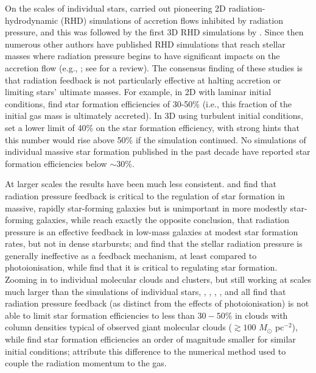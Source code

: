 \documentclass[useAMS,usenatbib]{mn2e}
\begin{document}
On the scales of individual stars, \citet{yorke02a} carried out pioneering 2D radiation-hydrodynamic (RHD) simulations of accretion flows inhibited by radiation pressure, and this was followed by the first 3D RHD simulations by \citet{krumholz09c}. Since then numerous other authors have published RHD simulations that reach stellar masses where radiation pressure begins to have significant impacts on the accretion flow (e.g., \citealt{kuiper10b, kuiper11a, cunningham11a, myers13a, kuiper15a, kuiper16a, klassen16a, rosen16a}; see \citealt{tan14a} for a review). The consensus finding of these studies is that radiation feedback is not particularly effective at halting accretion or limiting stars' ultimate masses. For example, in 2D with laminar initial conditions, \citet{kuiper10b} find star formation efficiencies of 30-50\% (i.e., this fraction of the initial gas mass is ultimately accreted). In 3D using turbulent initial conditions, \citet{rosen16a} set a lower limit of 40\% on the star formation efficiency, with strong hints that this number would rise above 50\% if the simulation continued. No simulations of individual massive star formation published in the past decade have reported star formation efficiencies below $\sim 30\%$.

At larger scales the results have been much less consistent. \citet{hopkins11a, hopkins12b} and \citet{hopkins12f} find that radiation pressure feedback is critical to the regulation of star formation in massive, rapidly star-forming galaxies but is unimportant in more modestly star-forming galaxies, while \citet{ceverino14a} reach exactly the opposite conclusion, that radiation pressure is an effective feedback in low-mass galaxies at modest star formation rates, but not in dense starbursts; \citet{sales14a} and \citet{rosdahl15a} find that the stellar radiation pressure is generally ineffective as a feedback mechanism, at least compared to photoionisation, while \citet{agertz13a} find that it is critical to regulating star formation. Zooming in to individual molecular clouds and clusters, but still working at scales much larger than the simulations of individual stars, \citet{skinner15a}, \citet{raskutti16a, raskutti17a}, \citet{kim17b}, \citet{tsang18a}, and \citet{kim18a}  all find that radiation pressure feedback (as distinct from the effects of photoionisation) is not able to limit star formation efficiencies to less than $30-50\%$ in clouds with column densities typical of observed giant molecular clouds ($\gtrsim 100$ $M_\odot$ pc$^{-2}$), while \citet{grudic18a} find star formation efficiencies an order of magnitude smaller for similar initial conditions; \citet{hopkins18a} attribute this difference to the numerical method used to couple the radiation momentum to the gas.
\end{document}
